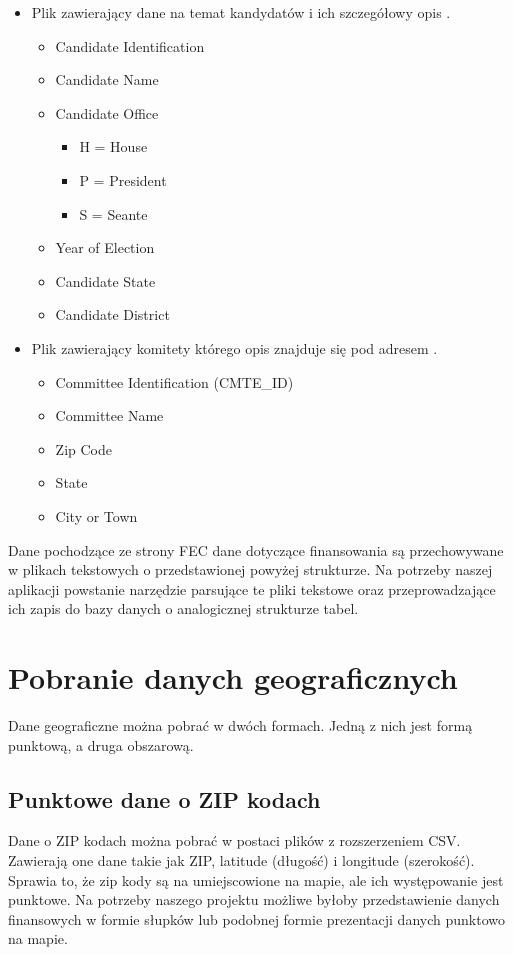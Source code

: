 \documentclass[10pt,a4paper]{article}
\begin{document}
\begin{itemize}
\item Plik zawierający dane na temat kandydatów i ich szczegółowy opis \cite{fecCandMasterFile2015}.

\begin{itemize}
\item Candidate Identification
\item Candidate Name
\item Candidate Office
\begin{itemize}
\item H = House
\item P = President
\item S = Seante
\end{itemize}
\item Year of Election
\item Candidate State
\item Candidate District
\end{itemize}


\item Plik zawierający komitety którego opis znajduje się pod adresem \cite{fecComMasterFile2015}.

\begin{itemize}
\item Committee Identification (CMTE\_ID)
\item Committee Name
\item Zip Code
\item State
\item City or Town
\end{itemize}
\end{itemize}


Dane pochodzące ze strony FEC dane dotyczące finansowania są przechowywane w plikach tekstowych o przedstawionej powyżej strukturze. Na potrzeby naszej aplikacji powstanie narzędzie parsujące te pliki tekstowe oraz przeprowadzające ich zapis do bazy danych o analogicznej strukturze tabel. 
\section{Pobranie danych geograficznych}
Dane geograficzne można pobrać w dwóch formach. Jedną z nich jest formą punktową, a druga obszarową.
\subsection{Punktowe dane o ZIP kodach\label{sec:punktZIP}}
Dane o ZIP kodach można pobrać w postaci plików z rozszerzeniem CSV. Zawierają one dane takie jak ZIP, latitude (długość) i longitude (szerokość). Sprawia to, że zip kody są na umiejscowione na mapie, ale ich występowanie jest punktowe. Na potrzeby naszego projektu możliwe byłoby przedstawienie danych finansowych w formie słupków lub podobnej formie prezentacji danych punktowo na mapie.
\end{document}
